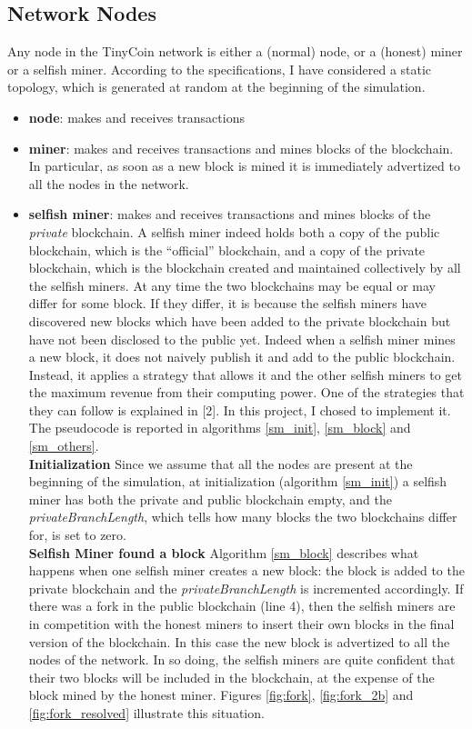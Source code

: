 \documentclass{article}
\begin{document}
\subsection{Network Nodes} Any node in the TinyCoin network is either a (normal) node, or a (honest) miner or a selfish miner. According to the specifications, I have considered a static topology, which is generated at random at the beginning of the simulation.
\begin{itemize}
\item \textbf{node}: makes and receives transactions
\item \textbf{miner}: makes and receives transactions and mines blocks of the blockchain. In particular, as soon as a new block is mined it is immediately advertized to all the nodes in the network.
\item \textbf{selfish miner}: makes and receives transactions and mines blocks of the \textit{private} blockchain. A selfish miner indeed holds both a copy of the public blockchain, which is the ``official'' blockchain, and a copy of the private blockchain, which is the blockchain created and maintained collectively by all the selfish miners. At any time the two blockchains may be equal or may differ for some block. If they differ, it is because the selfish miners have discovered new blocks which have been added to the private blockchain but have not been disclosed to the public yet. Indeed when a selfish miner mines a new block, it does not naively publish it and add to the public blockchain. Instead, it applies a strategy that allows it and the other selfish miners to get the maximum revenue from their computing power. One of the strategies that they can follow is explained in [2]. In this project, I chosed to implement it. The pseudocode is reported in algorithms \ref{sm_init}, \ref{sm_block} and \ref{sm_others}. \\
\textbf{Initialization} Since we assume that all the nodes are present at the beginning of the simulation, at initialization (algorithm \ref{sm_init}) a selfish miner has both the private and public blockchain empty, and the \textit{privateBranchLength}, which tells how many blocks the two blockchains differ for, is set to zero. \\
\textbf{Selfish Miner found a block} Algorithm \ref{sm_block} describes what happens when one selfish miner creates a new block: the block is added to the private blockchain and the \textit{privateBranchLength} is incremented accordingly. If there was a fork in the public blockchain (line 4), then the selfish miners are in competition with the honest miners to insert their own blocks in the final version of the blockchain. In this case the new block is advertized to all the nodes of the network. In so doing, the selfish miners are quite confident that their two blocks will be included in the blockchain, at the expense of the block mined by the honest miner. Figures \ref{fig:fork}, \ref{fig:fork_2b} and \ref{fig:fork_resolved} illustrate this situation. \\

\end{itemize}
\end{document}
